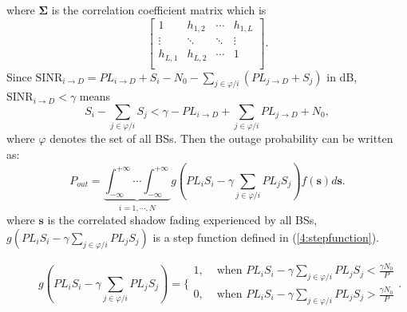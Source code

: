  where $\mathbf{\Sigma}$ is the correlation coefficient matrix which is
 \begin{equation}
 \left[\begin{array}{cccc}
 1 & h_{1,2} & \cdots & h_{1,L}\\
 \vdots & \ddots & \ddots & \vdots\\
 h_{L,1} & h_{L,2} & \cdots & 1\\
 \end{array}\right].
 \end{equation}
 Since $\text{SINR}_{i\to D}=PL_{i\to D}+S_{i}-N_{0}-\sum_{j\in\varphi/i}(PL_{j\to D} + S_{j})$ in dB, $\text{SINR}_{i\to D}<\gamma$ means
 \begin{equation}
 S_{i} - \sum_{j\in\varphi/i}S_{j}<\gamma -PL_{i\to D} + \sum_{j\in\varphi/i}PL_{j\to D} + N_{0},
 \end{equation}
 where $\varphi$ denotes the set of all BSs.
 Then the outage probability can be written as:
 \begin{equation}
 \label{4:outprob}
 P_{out} = \underbrace{\int_{-\infty}^{+\infty}\cdots\int_{-\infty}^{+\infty}}_{i =1,\cdots,N} g(PL_{i}S_{i} - \gamma\sum_{j\in\varphi/i}PL_{j}S_{j})f(\mathbf{s})d\mathbf{s}.
 \end{equation}
 where $\mathbf{s}$ is the correlated shadow fading experienced by all BSs, $g(PL_{i}S_{i} - \gamma\sum_{j\in\varphi/i}PL_{j}S_{j})$ is a step function defined in (\ref{4:stepfunction}). 
  \begin{figure}[!t]
 \normalsize

 \begin{equation}
 \label{4:stepfunction}
 g(PL_{i}S_{i} - \gamma\sum_{j\in\varphi/i}PL_{j}S_{j}) = \{\begin{array}{cc}
                1, &  \text{  when }PL_{i}S_{i} - \gamma\sum_{j\in\varphi/i}PL_{j}S_{j} <\frac{\gamma N_{0}}{P}\\
                0, & \text{  when }PL_{i}S_{i} - \gamma\sum_{j\in\varphi/i}PL_{j}S_{j} >\frac{\gamma N_{0}}{P}
              \end{array}.
 \end{equation}
 \hrulefill
 \vspace*{4pt}
 \end{figure}

